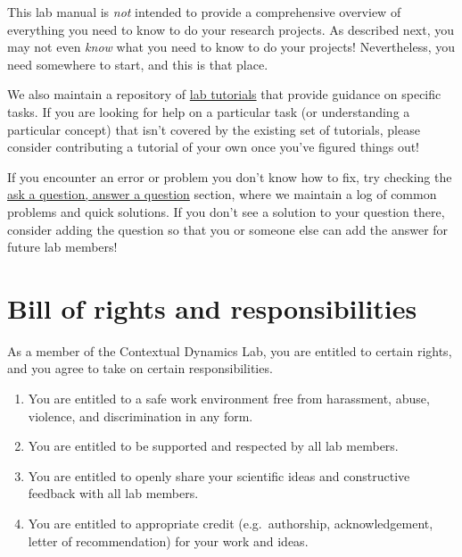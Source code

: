 \documentclass{tufte-book} %
\begin{document}
\noindent This lab manual is
\textit{not} intended to provide a comprehensive overview of
everything you need to know to do your research projects.  As
described next, you may not even \textit{know} what you need to know
to do your projects!  Nevertheless, you need somewhere to start, and
this is that place.

We also maintain a repository of
\href{https://github.com/ContextLab/CDL-tutorials}{lab tutorials} that
provide guidance on specific tasks.  If you are looking for help on a
particular task (or understanding a particular concept) that isn't
covered by the existing set of tutorials, please consider contributing
a tutorial of your own once you've figured things out!

If you encounter an error or problem you don't know how to fix, try
checking the \hyperref[ch:faq]{ask a question, answer a question}
section, where we maintain a log of common problems and quick
solutions. If you don't see a solution to your question there,
consider adding the question so that you or someone else can add
the answer for future lab members!


\chapter{Bill of rights and responsibilities}\label{ch:billofrights}
As a member of the Contextual Dynamics Lab, you are entitled to
certain rights, and you agree to take on certain responsibilities.
\begin{enumerate}
\item You are entitled to a safe work environment free from
  harassment, abuse, violence, and discrimination in any form.
  \item You are entitled to be supported and respected by all lab
    members.
  \item You are entitled to openly share your scientific ideas and
    constructive feedback with all lab members.
  \item You are entitled to appropriate credit (e.g.\ authorship,
    acknowledgement, letter of recommendation) for your work and
    ideas.
\end{enumerate}
\end{document}
